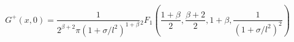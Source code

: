 \begin{equation}
\label{wight}
G^+(x,0) = \frac{1}{2^{\beta+2}\pi (1+\sigma /l^2)^{1+\beta}} {}_2 F_1
\left( \frac{1+\beta}{2},\frac{\beta+2}{2},1+\beta, \frac{1}{(1+\sigma /l^2)^2}\right)
\end{equation}

